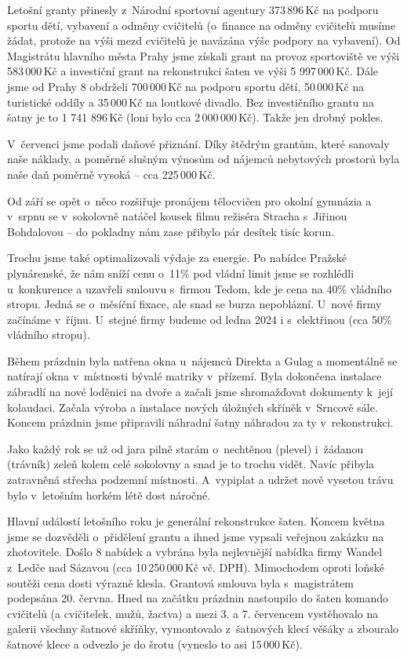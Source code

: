 \documentclass[11pt]{article}
\begin{document}
Letošní granty přinesly z~Národní sportovní agentury 373\,896\,Kč na podporu sportu dětí, vybavení a odměny cvičitelů (o~finance na odměny cvičitelů musíme žádat, protože na výši mezd cvičitelů je navázána výše podpory na vybavení). Od Magistrátu hlavního města Prahy jsme získali grant na provoz sportoviště ve výši 583\,000\,Kč a investiční grant na rekonstrukci šaten ve výši 5 997\,000\,Kč. Dále jsme od Prahy 8 obdrželi 700\,000\,Kč na podporu sportu dětí, 50\,000\,Kč na turistické oddíly a 35\,000\,Kč na loutkové divadlo. Bez investičního grantu na šatny je to 1 741 896\,Kč (loni bylo cca 2\,000\,000\,Kč). Takže jen drobný pokles.

V~červenci jsme podali daňové přiznání. Díky štědrým grantům, které sanovaly naše náklady, a poměrně slušným výnosům od nájemců nebytových prostorů byla naše daň poměrně vysoká – cca 225\,000\,Kč.

Od září se opět o~něco rozšiřuje pronájem tělocvičen pro okolní gymnázia a v~srpnu se v~sokolovně natáčel kousek filmu režiséra Stracha s~Jiřinou Bohdalovou – do pokladny nám zase přibylo pár desítek tisíc korun.

Trochu jsme také optimalizovali výdaje za energie. Po nabídce Pražské plynárenské, že nám sníží cenu o~11\% pod vládní limit jsme se rozhlédli u~konkurence a uzavřeli smlouvu s~firmou Tedom, kde je cena na 40\% vládního stropu. Jedná se o~měsíční fixace, ale snad se burza nepoblázní. U~nové firmy začínáme v~říjnu. U~stejné firmy budeme od ledna 2024 i s~elektřinou (cca 50\% vládního stropu).

Během prázdnin byla natřena okna u~nájemců Direkta a Gulag a momentálně se natírají okna v~místnosti bývalé matriky v~přízemí. Byla dokončena instalace zábradlí na nové loděnici na dvoře a začali jsme shromažďovat dokumenty k~její kolaudaci. Začala výroba a instalace nových úložných skříněk v~Srncově sále. Koncem prázdnin jsme připravili náhradní šatny náhradou za ty v~rekonstrukci.

Jako každý rok se už od jara pilně starám o~nechtěnou (plevel) i~žádanou (trávník) zeleň kolem celé sokolovny a snad je to trochu vidět. Navíc přibyla zatravněná střecha podzemní místnosti. A~vypiplat a udržet nově vysetou trávu bylo v~letošním horkém létě dost náročné.

Hlavní událostí letošního roku je generální rekonstrukce šaten. Koncem května jsme se dozvěděli o~přidělení grantu a ihned jsme vypsali veřejnou zakázku na zhotovitele. Došlo 8 nabídek a vybrána byla nejlevnější nabídka firmy Wandel z~Ledče nad Sázavou (cca 10\,250\,000\,Kč vč. DPH). Mimochodem oproti loňské soutěži cena dosti výrazně klesla. Grantová smlouva byla s~magistrátem podepsána 20. června. Hned na začátku prázdnin nastoupilo do šaten komando cvičitelů (a cvičitelek, mužů, žactva) a mezi 3. a 7. červencem vystěhovalo na galerii všechny šatnové skříňky, vymontovalo z~šatnových klecí věšáky a zbouralo šatnové klece a odvezlo je do šrotu (vyneslo to asi 15\,000\,Kč). 
\end{document}
